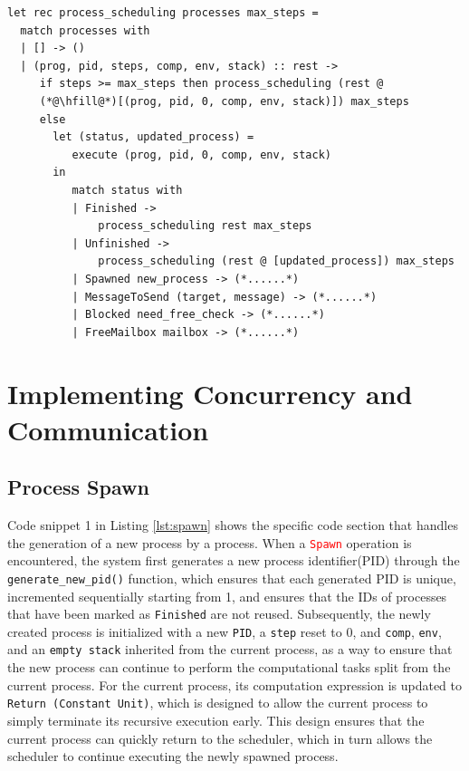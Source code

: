 \documentclass{l4proj}
\begin{document}
\noindent\begin{minipage}{\linewidth}
\lstset{style=Ocamlstyle,}
\begin{lstlisting}[caption={Implementation of a round-robin scheduler based on evaluation steps in the Pat language}, label={lst:Scheduler}]
let rec process_scheduling processes max_steps =
  match processes with
  | [] -> ()
  | (prog, pid, steps, comp, env, stack) :: rest ->
     if steps >= max_steps then process_scheduling (rest @
     (*@\hfill@*)[(prog, pid, 0, comp, env, stack)]) max_steps
     else
       let (status, updated_process) = 
          execute (prog, pid, 0, comp, env, stack) 
       in
          match status with
          | Finished -> 
              process_scheduling rest max_steps
          | Unfinished -> 
              process_scheduling (rest @ [updated_process]) max_steps
          | Spawned new_process -> (*......*)
          | MessageToSend (target, message) -> (*......*)
          | Blocked need_free_check -> (*......*)
          | FreeMailbox mailbox -> (*......*)

\end{lstlisting}
\end{minipage}


\section{Implementing Concurrency and Communication}

\subsection{Process Spawn}

Code snippet 1 in Listing \ref{lst:spawn} shows the specific code section that handles the generation of a new process by a process. When a \textcolor{red}{\texttt{Spawn}} operation is encountered, the system first generates a new process identifier(PID) through the \texttt{generate\_new\_pid()} function, which ensures that each generated PID is unique, incremented sequentially starting from 1, and ensures that the IDs of processes that have been marked as \texttt{Finished} are not reused. Subsequently, the newly created process is initialized with a new \texttt{PID}, a \texttt{step} reset to 0, and \texttt{comp}, \texttt{env}, and an \texttt{empty stack} inherited from the current process, as a way to ensure that the new process can continue to perform the computational tasks split from the current process. For the current process, its computation expression is updated to \texttt{Return (Constant Unit)}, which is designed to allow the current process to simply terminate its recursive execution early. This design ensures that the current process can quickly return to the scheduler, which in turn allows the scheduler to continue executing the newly spawned process.
\end{document}
